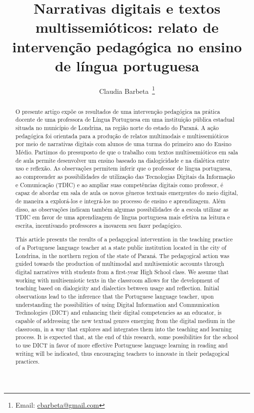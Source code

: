 \documentclass[portuguese]{textolivre}
\title{Narrativas digitais e textos multissemióticos: relato de intervenção pedagógica no ensino de língua portuguesa}
\author[1]{Claudia Barbeta~\orcid{0000-0002-2931-5933}\thanks{Email: \href{mailto:cbarbeta@gmail.com}{cbarbeta@gmail.com}}}
\affil[1]{Universidade Estadual de Londrina, Londrina, PR, Brasil.}
\begin{document}
\maketitle

\begin{polyabstract}
\begin{abstract}
O presente artigo expõe os resultados de uma intervenção pedagógica na prática docente de uma professora de Língua Portuguesa em uma instituição pública estadual situada no município de Londrina, na região norte do estado do Paraná. A ação pedagógica foi orientada para a produção de relatos multimodais e multissemióticos por meio de narrativas digitais com alunos de uma turma do primeiro ano do Ensino Médio. Partimos do pressuposto de que o trabalho com textos multissemióticos em sala de aula permite desenvolver um ensino baseado na dialogicidade e na dialética entre uso e reflexão. As observações permitem inferir que o professor de língua portuguesa, ao compreender as possibilidades de utilização das Tecnologias Digitais da Informação e Comunicação (TDIC) e ao ampliar suas competências digitais como professor, é capaz de abordar em sala de aula os novos gêneros textuais emergentes do meio digital, de maneira a explorá-los e integrá-los no processo de ensino e aprendizagem. Além disso, as observações indicam também algumas possibilidades de a escola utilizar as TDIC em favor de uma aprendizagem de língua portuguesa mais efetiva na leitura e escrita, incentivando professores a inovarem seu fazer pedagógico.

\end{abstract}

\begin{english}
\begin{abstract}
This article presents the results of a pedagogical intervention in the teaching practice of a Portuguese language teacher at a state public institution located in the city of Londrina, in the northern region of the state of Paraná. The pedagogical action was guided towards the production of multimodal and multisemiotic accounts through digital narratives with students from a first-year High School class. We assume that working with multisemiotic texts in the classroom allows for the development of teaching based on dialogicity and dialectics between usage and reflection. Initial observations lead to the inference that the Portuguese language teacher, upon understanding the possibilities of using Digital Information and Communication Technologies (DICT) and enhancing their digital competencies as an educator, is capable of addressing the new textual genres emerging from the digital medium in the classroom, in a way that explores and integrates them into the teaching and learning process. It is expected that, at the end of this research, some possibilities for the school to use DICT in favor of more effective Portuguese language learning in reading and writing will be indicated, thus encouraging teachers to innovate in their pedagogical practices.



\end{abstract}
\end{english}
\end{polyabstract}
\end{document}
